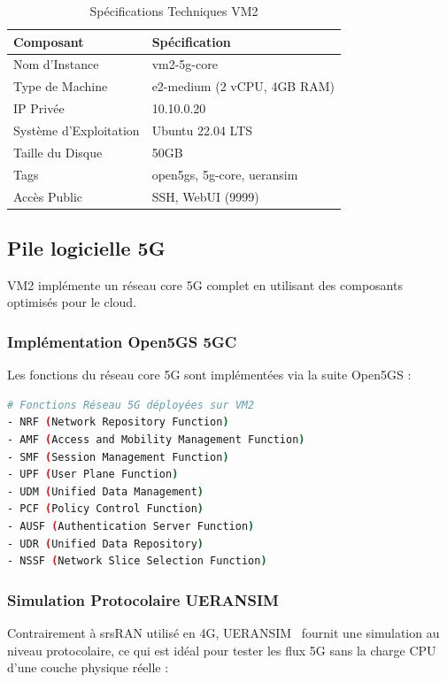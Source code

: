 \documentclass[12pt,a4paper]{report}
\begin{document}
\begin{table}[H]
\centering
\caption{Spécifications Techniques VM2}
\label{tab:vm2-specs}
\begin{tabular}{@{}ll@{}}
\toprule
Composant & Spécification \\
\midrule
Nom d'Instance & vm2-5g-core \\
Type de Machine & e2-medium (2 vCPU, 4GB RAM) \\
IP Privée & 10.10.0.20 \\
Système d'Exploitation & Ubuntu 22.04 LTS \\
Taille du Disque & 50GB \\
Tags & open5gs, 5g-core, ueransim \\
Accès Public & SSH, WebUI (9999) \\
\bottomrule
\end{tabular}
\end{table}

\subsection{Pile logicielle 5G}

VM2 implémente un réseau core 5G complet en utilisant des composants optimisés pour le cloud.

\subsubsection{Implémentation Open5GS 5GC}

Les fonctions du réseau core 5G sont implémentées via la suite Open5GS :

\begin{lstlisting}[caption=Composants Core Open5GS 5G, language=bash]
# Fonctions Réseau 5G déployées sur VM2
- NRF (Network Repository Function)
- AMF (Access and Mobility Management Function)
- SMF (Session Management Function)
- UPF (User Plane Function)
- UDM (Unified Data Management)
- PCF (Policy Control Function)
- AUSF (Authentication Server Function)
- UDR (Unified Data Repository)
- NSSF (Network Slice Selection Function)
\end{lstlisting}

\subsubsection{Simulation Protocolaire UERANSIM}

Contrairement à srsRAN utilisé en 4G, UERANSIM~\cite{ueransim-docs} fournit une simulation au niveau protocolaire, ce qui est idéal pour tester les flux 5G sans la charge CPU d'une couche physique réelle :
\end{document}
